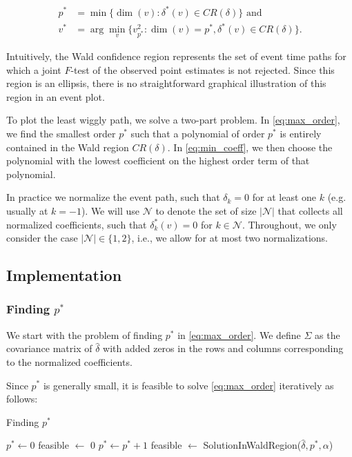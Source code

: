 \documentclass[12pt]{article}
\begin{document}
\begin{align}
  p^* &= \min\{\dim(v): \delta^*(v) \in CR(\delta)\} \text{ and}  \label{eq:max_order} \\
  v^* &= \arg\min_{v}\{v_{p^*}^2: \dim(v)=p^*, \delta^*(v) \in CR(\delta)\}. \label{eq:min_coeff}
\end{align}

Intuitively, the Wald confidence region represents the set of event time paths for which a joint $F$-test of the observed point estimates is not rejected.
Since this region is an ellipsis, there is no straightforward graphical illustration of this region in an event plot.

To plot the least wiggly path, we solve a two-part problem.
In \eqref{eq:max_order}, we find the smallest order $p^*$ such that a polynomial of order $p^*$ is entirely contained in the Wald region $CR(\delta)$.
In \eqref{eq:min_coeff}, we then choose the polynomial with the lowest coefficient on the highest order term of that polynomial.

In practice we normalize the event path, such that $\delta_{k} = 0$ for at least one $k$ (e.g. usually at $k=-1$).
We will use $\mathcal{N}$ to denote the set of size $|\mathcal{N}|$ that collects all normalized coefficients, such that $\delta_{k}^*(v)=0$ for $k \in \mathcal{N}$.
Throughout, we only consider the case $ |\mathcal{N}| \in\{1,2\}$, i.e., we allow for at most two normalizations.

\subsection{Implementation}

\subsubsection{Finding $p^*$}

We start with the problem of finding $p^*$ in \eqref{eq:max_order}.
We define $\Sigma$ as the covariance matrix of $\widehat \delta$ with added zeros in the rows and columns corresponding to the normalized coefficients.

Since $p^*$ is generally small, it is feasible to solve \eqref{eq:max_order} iteratively as follows:
\begin{algorithm}
\caption{Finding $p^*$}
\label{alg:find_p}
\begin{algorithmic}
\State $p^* \gets 0$
\State feasible $\gets$ 0
    \State $p^* \gets p^*+1$
  \State feasible $\gets$ SolutionInWaldRegion($\widehat\delta,p^*,\alpha$)
\EndWhile
\end{algorithmic}
\end{algorithm}
\end{document}
